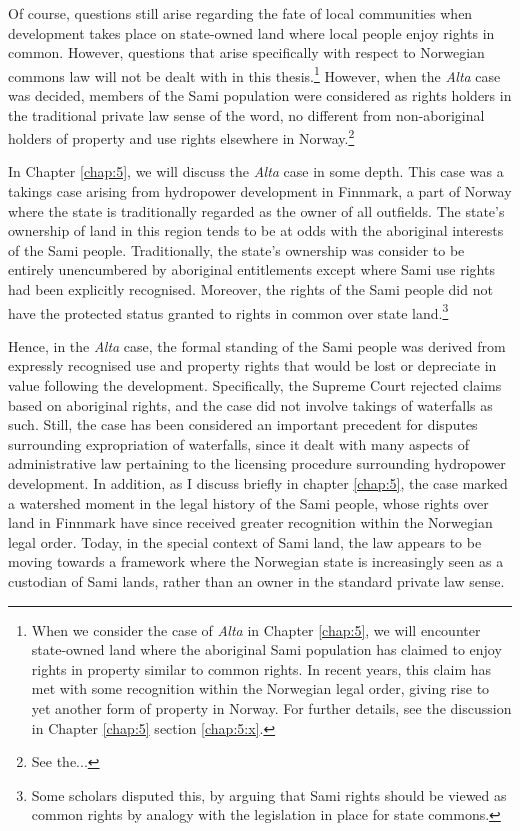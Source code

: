Of course, questions still arise regarding the fate of local communities when development takes place on state-owned land where local people enjoy rights in common. However, questions that arise specifically with respect to Norwegian commons law will not be dealt with in this thesis.\footnote{When we consider the case of {\it Alta} in Chapter \ref{chap:5}, we will encounter state-owned land where the aboriginal Sami population has claimed to enjoy rights in property similar to common rights. In recent years, this claim has met with some recognition within the Norwegian legal order, giving rise to yet another form of property in Norway. For further details, see the discussion in Chapter \ref{chap:5} section \ref{chap:5:x}.} However, when the {\it Alta} case was decided, members of the Sami population were considered as rights holders in the traditional private law sense of the word, no different from non-aboriginal holders of property and use rights elsewhere in Norway.\footnote{See the...}

In Chapter \ref{chap:5}, we will discuss the {\it Alta} case in some depth. This case was a takings case arising from hydropower development in Finnmark, a part of Norway where the state is traditionally regarded as the owner of all outfields. The state's ownership of land in this region tends to be at odds with the aboriginal interests of the Sami people. Traditionally, the state's ownership was consider to be entirely unencumbered by aboriginal entitlements except where Sami use rights had been explicitly recognised. Moreover, the rights of the Sami people did not have the protected status granted to rights in common over state land.\footnote{Some scholars disputed this, by arguing that Sami rights should be viewed as common rights by analogy with the legislation in place for state commons.} 

Hence, in the {\it Alta} case, the formal standing of the Sami people was derived from expressly recognised use and property rights that would be lost or depreciate in value following the development. Specifically, the Supreme Court rejected claims based on aboriginal rights, and the case did not involve takings of waterfalls as such. Still, the case has been considered an important precedent for disputes surrounding expropriation of waterfalls, since it dealt with many aspects of administrative law pertaining to the licensing procedure surrounding hydropower development. In addition, as I discuss briefly in chapter \ref{chap:5}, the case marked a watershed moment in the legal history of the Sami people, whose rights over land in Finnmark have since received greater recognition within the Norwegian legal order. Today, in the special context of Sami land, the law appears to be moving towards a framework where the Norwegian state is increasingly seen as a custodian of Sami lands, rather than an owner in the standard private law sense.

